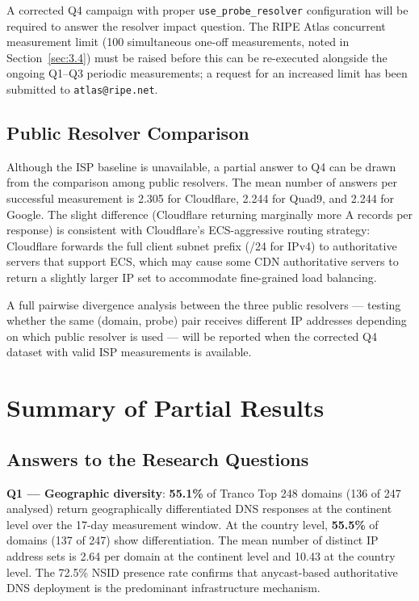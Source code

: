 A corrected Q4 campaign with proper \texttt{use\_probe\_resolver} configuration will be required to answer the resolver impact question. The RIPE Atlas concurrent measurement limit (100 simultaneous one-off measurements, noted in Section~\ref{sec:3.4}) must be raised before this can be re-executed alongside the ongoing Q1--Q3 periodic measurements; a request for an increased limit has been submitted to \texttt{atlas@ripe.net}.

\subsection{Public Resolver Comparison}
\label{subsec:4.5.4}

Although the ISP baseline is unavailable, a partial answer to Q4 can be drawn from the comparison among public resolvers. The mean number of answers per successful measurement is 2.305 for Cloudflare, 2.244 for Quad9, and 2.244 for Google. The slight difference (Cloudflare returning marginally more A records per response) is consistent with Cloudflare's ECS-aggressive routing strategy: Cloudflare forwards the full client subnet prefix (/24 for IPv4) to authoritative servers that support ECS, which may cause some CDN authoritative servers to return a slightly larger IP set to accommodate fine-grained load balancing.

A full pairwise divergence analysis between the three public resolvers --- testing whether the same (domain, probe) pair receives different IP addresses depending on which public resolver is used --- will be reported when the corrected Q4 dataset with valid ISP measurements is available.

\bigskip
\section{Summary of Partial Results}
\label{sec:4.6}

\subsection{Answers to the Research Questions}
\label{subsec:4.6.1}

\textbf{Q1 --- Geographic diversity}: \textbf{55.1\%} of Tranco Top 248 domains (136 of 247 analysed) return geographically differentiated DNS responses at the continent level over the 17-day measurement window. At the country level, \textbf{55.5\%} of domains (137 of 247) show differentiation. The mean number of distinct IP address sets is 2.64 per domain at the continent level and 10.43 at the country level. The 72.5\% NSID presence rate confirms that anycast-based authoritative DNS deployment is the predominant infrastructure mechanism.

